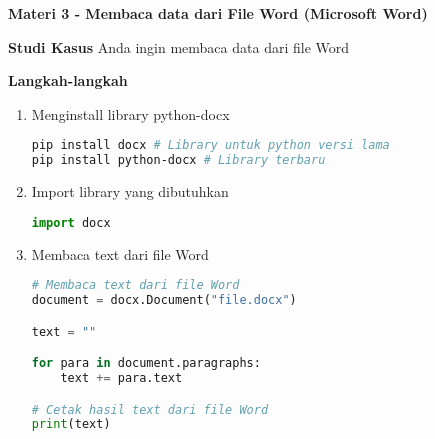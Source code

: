 \documentclass{article}
\begin{document}
    \begin{flushleft}
        \textbf{Materi 3 \@- Membaca data dari File Word (Microsoft Word)}
        \newline

        \textbf{Studi Kasus}
        \newline
        Anda ingin membaca data dari file Word
        \newline

        \textbf{Langkah-langkah}

        \begin{enumerate}
            \item Menginstall library python-docx
            \lstset{style=bashstyle}
            \begin{lstlisting}[language=bash]
pip install docx # Library untuk python versi lama
pip install python-docx # Library terbaru
            \end{lstlisting}

            \item Import library yang dibutuhkan
            \lstset{style=pythonstyle}
            \begin{lstlisting}[language=python]
import docx
            \end{lstlisting}

            \item Membaca text dari file Word
            \lstset{style=pythonstyle}
            \begin{lstlisting}[language=python]
# Membaca text dari file Word
document = docx.Document("file.docx")

text = ""

for para in document.paragraphs:
    text += para.text

# Cetak hasil text dari file Word
print(text)
            \end{lstlisting}
        \end{enumerate}
    \end{flushleft}
\end{document}
